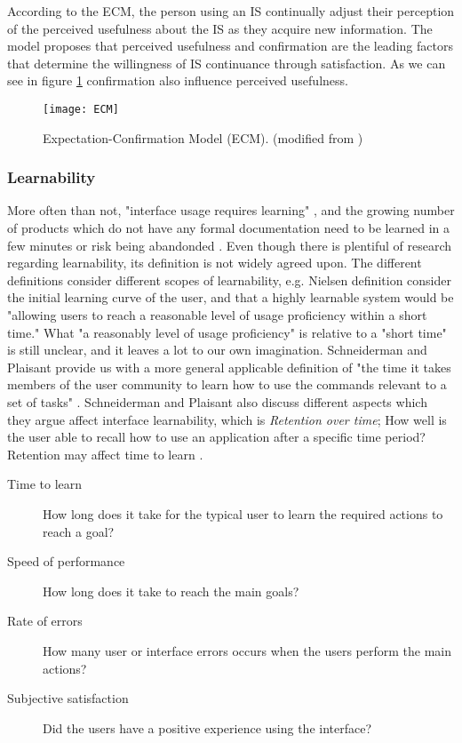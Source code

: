According to the ECM, the person using an IS continually adjust their perception of the perceived usefulness about the IS as they acquire new information. The model proposes that perceived usefulness and confirmation are the leading factors that determine the willingness of IS continuance through satisfaction. As we can see in figure \ref{fig:ECM} confirmation also influence perceived usefulness.

\begin{figure}[h]
  \centering
    \texttt{[image: ECM]}
  \caption{Expectation-Confirmation Model (ECM). (modified from \cite{Bhattacherjee2001a})}
  \label{fig:ECM}
\end{figure}

\subsubsection{Learnability}
More often than not, "interface usage requires learning" \cite{Grossman2009}, and the growing number of  products which do not have any formal documentation need to be learned in a few minutes or risk being abandonded \cite{Bergman2000}. Even though there is plentiful of research regarding learnability, its definition is not widely agreed upon. The different definitions consider different scopes of learnability, e.g. Nielsen definition consider the initial learning curve of the user, and that a highly learnable system would be "allowing users to reach a reasonable level of usage proficiency within a short time." What "a reasonably level of usage proficiency" is relative to a "short time" is still unclear, and it leaves a lot to our own imagination. Schneiderman and Plaisant provide us with a more general applicable definition of "the time it takes members of the user community to learn how to use the commands relevant to a set of tasks" \cite{Shneiderman2004}. Schneiderman and Plaisant also discuss different aspects which they argue affect interface learnability, which is \textit{Retention over time}; How well is the user able to recall how to use an application after a specific time period? Retention may affect time to learn \cite{Shneiderman2004}.

\begin{description}
  \item[Time to learn] How long does it take for the typical user to learn the required actions to reach a goal?
  \item[Speed of performance] How long does it take to reach the main goals?
  \item[Rate of errors] How many user or interface errors occurs when the users perform the main actions?
  \item[Subjective satisfaction] Did the users have a positive experience using the interface?
\end{description}

